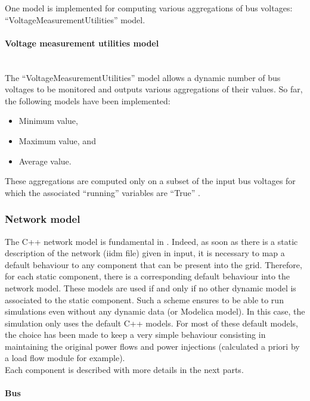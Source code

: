 \documentclass[a4paper, 12pt]{report}
\begin{document}
One model is implemented for computing various aggregations of bus voltages: ``VoltageMeasurementUtilities''  model.

\paragraph{Voltage measurement utilities model}
~~\\

The ``VoltageMeasurementUtilities'' model allows a dynamic number of bus voltages to be monitored and outputs various aggregations of their values.
So far, the following models have been implemented:
\begin{itemize}
\item Minimum value,
\item Maximum value, and
\item Average value.
\end{itemize}

These aggregations are computed only on a subset of the input bus voltages for which the associated ``running''  variables are ``True'' .

\subsubsection{Network model}
\label{Network}

The C++ network model is fundamental in \Dynawo. Indeed, as soon as there is a static description of the network (iidm file) given in input, it is necessary to map a default behaviour to any component that can be present into the grid. Therefore, for each static component, there is a corresponding default behaviour into the network model. These models are used if and only if no other dynamic model is associated to the static component. Such a scheme ensures to be able to run simulations even without any dynamic data (or Modelica model). In this case, the simulation only uses the default C++ models. For most of these default models, the choice has been made to keep a very simple behaviour consisting in maintaining the original power flows and power injections (calculated a priori by a load flow module for example). \\
Each component is described with more details in the next parts. \\

\paragraph{Bus}
~~\\
\end{document}
